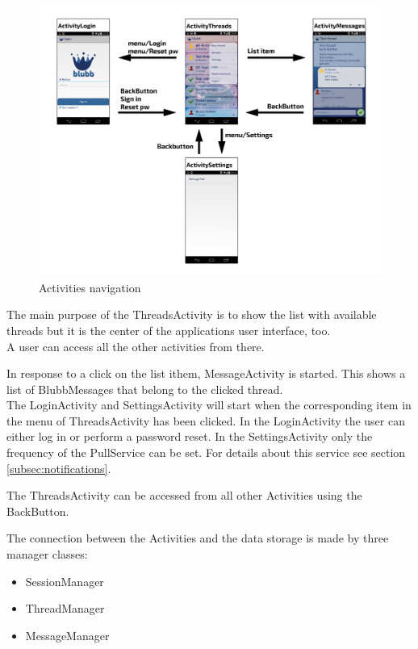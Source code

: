 \documentclass[12pt,a4paper,oneside]{report}
\begin{document}
\begin{figure}[!ht]
	\centering
    \includegraphics[width=\linewidth]{ActivitiesOverview.png}
	\caption{Activities navigation}
	\label{fig:ActivitiesNav}
\end{figure}

The main purpose of the ThreadsActivity is to show the list with available threads but it is the center of the applications user interface, too.\\ 
A user can access all the other activities from there. 


In response to a click on the list ithem, MessageActivity is started. This shows a list of BlubbMessages that belong to the clicked thread. \\
The LoginActivity and SettingsActivity will start when the corresponding item in the menu of ThreadsActivity has been clicked. In the LoginActivity the user can either log in or perform a password reset.
In the SettingsActivity only the frequency of the PullService can be set. For details about this service see section \ref{subsec:notifications}.


The ThreadsActivity can be accessed from all other Activities using the BackButton.


The connection between the Activities and the data storage is made by three manager classes:
\begin{itemize}
\item{SessionManager}
\item{ThreadManager}
\item{MessageManager}
\end{itemize}
\end{document}

